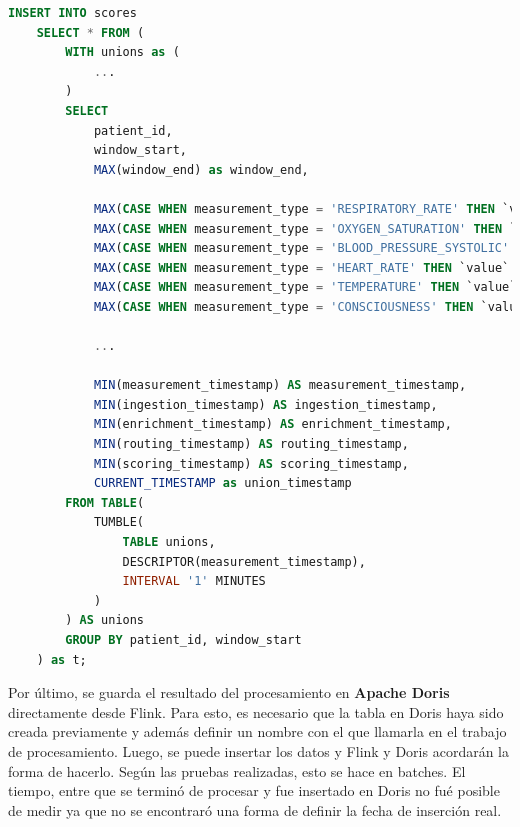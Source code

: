 \begin{lstlisting}[language=sql]
    INSERT INTO scores
    SELECT * FROM (
        WITH unions as (
            ...
        )
        SELECT 
            patient_id,
            window_start,
            MAX(window_end) as window_end,

            MAX(CASE WHEN measurement_type = 'RESPIRATORY_RATE' THEN `value` END) as respiratory_rate_value,
            MAX(CASE WHEN measurement_type = 'OXYGEN_SATURATION' THEN `value` END) as oxygen_saturation_value,
            MAX(CASE WHEN measurement_type = 'BLOOD_PRESSURE_SYSTOLIC' THEN `value` END) as blood_pressure_value,
            MAX(CASE WHEN measurement_type = 'HEART_RATE' THEN `value` END) as heart_rate_value,
            MAX(CASE WHEN measurement_type = 'TEMPERATURE' THEN `value` END) as temperature_value,
            MAX(CASE WHEN measurement_type = 'CONSCIOUSNESS' THEN `value` END) as consciousness_value,

            ...

            MIN(measurement_timestamp) AS measurement_timestamp,
            MIN(ingestion_timestamp) AS ingestion_timestamp,
            MIN(enrichment_timestamp) AS enrichment_timestamp,
            MIN(routing_timestamp) AS routing_timestamp,
            MIN(scoring_timestamp) AS scoring_timestamp,
            CURRENT_TIMESTAMP as union_timestamp
        FROM TABLE(
            TUMBLE(
                TABLE unions, 
                DESCRIPTOR(measurement_timestamp), 
                INTERVAL '1' MINUTES
            )
        ) AS unions 
        GROUP BY patient_id, window_start
    ) as t;
\end{lstlisting}

\newpage
Por último, se guarda el resultado del procesamiento en \textbf{Apache Doris} directamente desde Flink.
Para esto, es necesario que la tabla en Doris haya sido creada previamente y además definir un nombre con el que llamarla en el trabajo de procesamiento.
Luego, se puede insertar los datos y Flink y Doris acordarán la forma de hacerlo. Según las pruebas realizadas, esto se hace en batches. 
El tiempo, entre que se terminó de procesar y fue insertado en Doris no fué posible de medir ya que no se encontraró una forma de definir la fecha de inserción real.

\newpage

